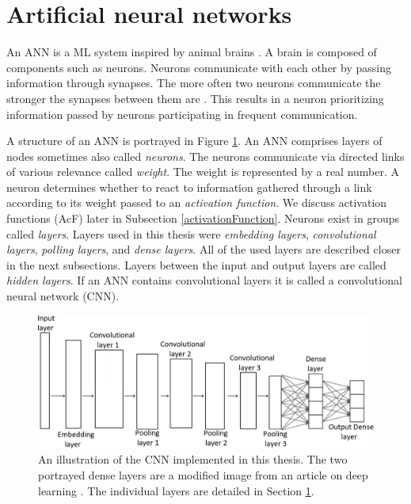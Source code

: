 \section{Artificial neural networks} \label{artificialNeuralNetworks}
An ANN is a ML system inspired by animal brains \cite{machineLeraningApproaches}. A brain is composed of components such as neurons. Neurons communicate with each other by passing information through synapses. The more often two neurons communicate the stronger the synapses between them are \cite{neuronsInBrain}. This results in a neuron prioritizing information passed by neurons participating in frequent communication. 

A structure of an ANN is portrayed in Figure \ref{structureOfCNN}. An ANN comprises layers of nodes sometimes also called \textit{neurons}. The neurons communicate via directed links of various relevance called \textit{weight}. The weight is represented by a real number. A neuron determines whether to react to information gathered through a link according to its weight passed to an \textit{activation function}. We discuss activation functions (AcF) later in Subsection \ref{activationFunction}. Neurons exist in groups called \textit{layers}. Layers used in this thesis were \textit{embedding layers}, \textit{convolutional layers}, \textit{polling layers}, and \textit{dense layers}. All of the used layers are described closer in the next subsections. Layers between the input and output layers are called \textit{hidden layers}. If an ANN contains convolutional layers it is called a convolutional neural network (CNN).
\begin{figure}[ht!]
  \centering
  \includegraphics[width=\textwidth]{Images/structureOfCNN.png}
  \caption{An illustration of the CNN implemented in this thesis. The two portrayed dense layers are a modified image from an article on deep learning \cite{structureOfCNN}. The individual layers are detailed in Section \ref{artificialNeuralNetworks}.} 
  \label{structureOfCNN}
\end{figure} 

